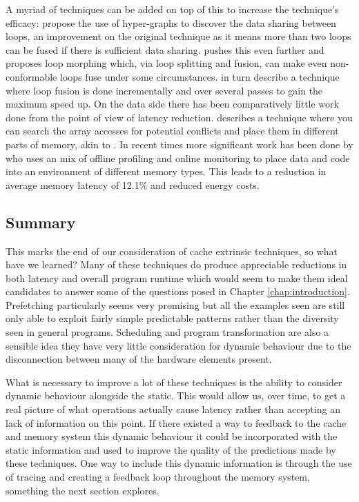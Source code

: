 A myriad of techniques can be added on top of this to increase the technique's efficacy: \citet{dingMemoryBandwidthBottleneck2000} propose the use of hyper-graphs to discover the data sharing between loops, an improvement on the original technique as it means more than two loops can be fused if there is sufficient data sharing. \citet{gomezOptimizingMemoryBandwidth2004} pushes this even further and proposes loop morphing which, via loop splitting and fusion, can make even non-conformable loops fuse under some circumstances. \citet{marchalOptimizingMemoryBandwidth2004} in turn describe a technique where loop fusion is done incrementally and over several passes to gain the maximum speed up. On the data side there has been comparatively little work done from the point of view of latency reduction. \citet{qaziOptimizationAccessLatency2016} describes a technique where you can search the array accesses for potential conflicts and place them in different parts of memory, akin to \citet{pandaMemoryDataOrganization1997}. In recent times more significant work has been done by \citet{weiExploitingProgramSemantics2015} who uses an mix of offline profiling and online monitoring to place data and code into an environment of different memory types. This leads to a reduction in average memory latency of 12.1\% and reduced energy costs.

\subsection{Summary}

This marks the end of our consideration of cache extrinsic techniques, so what have we learned? Many of these techniques do produce appreciable reductions in both latency and overall program runtime which would seem to make them ideal candidates to answer some of the questions posed in Chapter \ref{chap:introduction}.  Prefetching particularly seems very promising but all the examples seen are still only able to exploit fairly simple predictable patterns rather than the diversity seen in general programs. Scheduling and program transformation are also a sensible idea they have very little consideration for dynamic behaviour due to the disconnection between many of the hardware elements present. 
 
What is necessary to improve a lot of these techniques is the ability to consider dynamic behaviour alongside the static. This would allow us, over time, to get a real picture of what operations actually cause latency rather than accepting an lack of information on this point. If there existed a way to feedback to the cache and memory system this dynamic behaviour it could be incorporated with the static information and used to improve the quality of the predictions made by these techniques. One way to include this dynamic information is through the use of tracing and creating a feedback loop throughout the memory system, something the next section explores.

